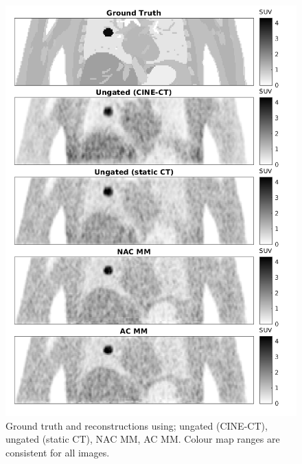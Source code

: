             \begin{figure}
                \centering
                
                \includegraphics[width=1.0\linewidth]{figures/motion_correction_1_results_2_visual_analysis.png}
                
                \captionsetup{singlelinecheck=false, justification=centering}
                \caption{Ground truth and reconstructions using; ungated (CINE-\gls{CT}), ungated (static \gls{CT}), \gls{NAC} \gls{MM}, \gls{AC} \gls{MM}. Colour map ranges are consistent for all images.}
                \label{fig:pet_ct_respiratory_motion_correction_with_a_single_attenuation_map_using_nac_derived_deformation_fields_results_visual_analysis}
            \end{figure}
            
